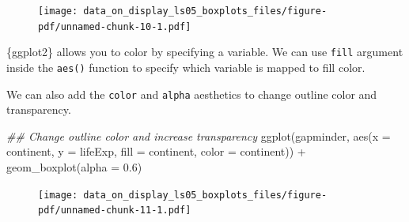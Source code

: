 \documentclass[
  letterpaper,
  DIV=11,
  numbers=noendperiod]{scrreprt}
\newenvironment{Shaded}{\begin{snugshade}}{\end{snugshade}}
\newcommand{\AttributeTok}[1]{\textcolor[rgb]{0.40,0.45,0.13}{#1}}
\newcommand{\DocumentationTok}[1]{\textcolor[rgb]{0.37,0.37,0.37}{\textit{#1}}}
\newcommand{\FloatTok}[1]{\textcolor[rgb]{0.68,0.00,0.00}{#1}}
\newcommand{\FunctionTok}[1]{\textcolor[rgb]{0.28,0.35,0.67}{#1}}
\newcommand{\NormalTok}[1]{\textcolor[rgb]{0.00,0.23,0.31}{#1}}
\newcommand{\SpecialCharTok}[1]{\textcolor[rgb]{0.37,0.37,0.37}{#1}}
\begin{document}
\begin{figure}[H]

{\centering \texttt{[image: data\_on\_display\_ls05\_boxplots\_files/figure-pdf/unnamed-chunk-10-1.pdf]}

}

\end{figure}

\begin{tcolorbox}[enhanced jigsaw, colframe=quarto-callout-note-color-frame, rightrule=.15mm, opacityback=0, breakable, coltitle=black, colbacktitle=quarto-callout-note-color!10!white, bottomrule=.15mm, leftrule=.75mm, toprule=.15mm, arc=.35mm, bottomtitle=1mm, colback=white, left=2mm, opacitybacktitle=0.6, titlerule=0mm, title=\textcolor{quarto-callout-note-color}{\faInfo}\hspace{0.5em}{Reminder}, toptitle=1mm]

\{ggplot2\} allows you to color by specifying a variable. We can use
\texttt{fill} argument inside the \texttt{aes()} function to specify
which variable is mapped to fill color.

\end{tcolorbox}

We can also add the \texttt{color} and \texttt{alpha} aesthetics to
change outline color and transparency.

\begin{Shaded}
\begin{Highlighting}[]
\DocumentationTok{\#\# Change outline color and increase transparency}
\FunctionTok{ggplot}\NormalTok{(gapminder, }
       \FunctionTok{aes}\NormalTok{(}\AttributeTok{x =}\NormalTok{ continent,}
           \AttributeTok{y =}\NormalTok{ lifeExp, }
           \AttributeTok{fill =}\NormalTok{ continent,}
           \AttributeTok{color =}\NormalTok{ continent)) }\SpecialCharTok{+}
  \FunctionTok{geom\_boxplot}\NormalTok{(}\AttributeTok{alpha =} \FloatTok{0.6}\NormalTok{)}
\end{Highlighting}
\end{Shaded}

\begin{figure}[H]

{\centering \texttt{[image: data\_on\_display\_ls05\_boxplots\_files/figure-pdf/unnamed-chunk-11-1.pdf]}

}

\end{figure}
\end{document}
